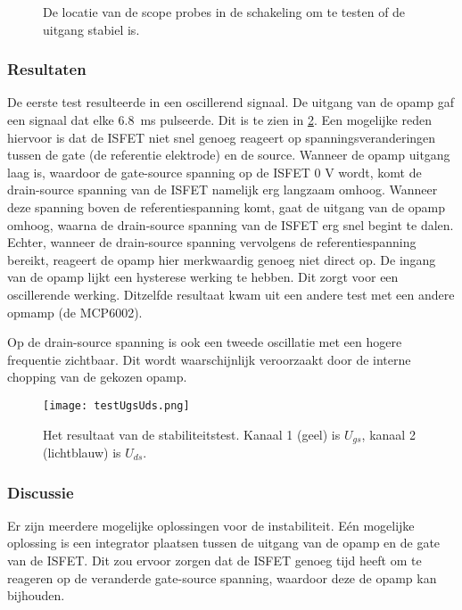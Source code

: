 \begin{figure}[ht]
    \centering
    \def\svgwidth{0.75\textwidth}
    
    \caption{De locatie van de scope probes in de schakeling om te testen of de uitgang stabiel is.}
    \label{fig:test ISFET circuit best}
\end{figure}


\subsubsection{Resultaten}

De eerste test resulteerde in een oscillerend signaal. De uitgang van de opamp gaf een signaal dat elke \qty{6.8}{\milli\second} pulseerde. Dit is te zien in \cref{fig:resultUgsUds}.
Een mogelijke reden hiervoor is dat de ISFET niet snel genoeg reageert op spanningsveranderingen tussen de gate (de referentie elektrode) en de source. Wanneer de opamp uitgang laag is, waardoor de gate-source spanning op de ISFET 0 V wordt, komt de drain-source spanning van de ISFET namelijk erg langzaam omhoog. Wanneer deze spanning boven de referentiespanning komt, gaat de uitgang van de opamp omhoog, waarna de drain-source spanning van de ISFET erg snel begint te dalen. Echter, wanneer de drain-source spanning vervolgens de referentiespanning bereikt, reageert de opamp hier merkwaardig genoeg niet direct op. De ingang van de opamp lijkt een hysterese werking te hebben. Dit zorgt voor een oscillerende werking. Ditzelfde resultaat kwam uit een andere test met een andere opmamp (de MCP6002).

Op de drain-source spanning is ook een tweede oscillatie met een hogere frequentie zichtbaar. Dit wordt waarschijnlijk veroorzaakt door de interne chopping van de gekozen opamp.


\begin{figure}[ht]
    \centering
    \def\svgwidth{0.75\textwidth}
    \texttt{[image: testUgsUds.png]}
    \caption{Het resultaat van de stabiliteitstest. Kanaal 1 (geel) is $U_{gs}$, kanaal 2 (lichtblauw) is $U_{ds}$.}
    \label{fig:resultUgsUds}
\end{figure}


\subsubsection{Discussie}
Er zijn meerdere mogelijke oplossingen voor de instabiliteit.
Eén mogelijke oplossing is een integrator plaatsen tussen de uitgang van de opamp en de gate van de ISFET. Dit zou ervoor zorgen dat de ISFET genoeg tijd heeft om te reageren op de veranderde gate-source spanning, waardoor deze de opamp kan bijhouden.

